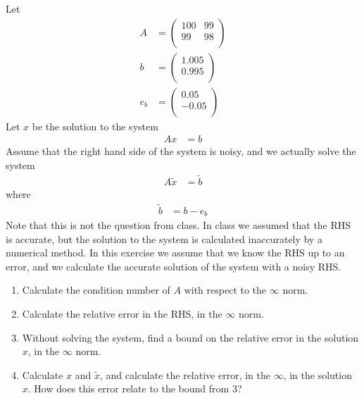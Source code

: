 \documentclass[fleqn, a4paper, 11pt, oneside]{amsart}
\theoremstyle{definition}
\theoremstyle{theorem}
\begin{document}
\begin{question}
	Let
	\begin{align*}
		A &=
			\begin{pmatrix}
				100 & 99 \\
				99  & 98 \\
			\end{pmatrix}\\
		b &=
			\begin{pmatrix}
				1.005 \\
				0.995 \\
			\end{pmatrix}\\
		e_b &=
			\begin{pmatrix}
				0.05  \\
				-0.05 \\
			\end{pmatrix}
	\end{align*}
	Let $x$ be the solution to the system
	\begin{align*}
		A x & = b
	\end{align*}
	Assume that the right hand side of the system is noisy, and we actually solve the system
	\begin{align*}
		A \tilde{x} & = \tilde{b}
	\end{align*}
	where
	\begin{align*}
		\tilde{b} & = b - e_b
	\end{align*}
	Note that this is not the question from class.
	In class we assumed that the RHS is accurate, but the solution to the system is calculated inaccurately by a numerical method.
	In this exercise we assume that we know the RHS up to an error, and we calculate the accurate solution of the system with a noisy RHS.
	\begin{enumerate}
		\item
			Calculate the condition number of $A$ with respect to the $\infty$ norm.
		\item
			Calculate the relative error in the RHS, in the $\infty$ norm.
		\item
			Without solving the system, find a bound on the relative error in the solution $x$, in the $\infty$ norm.
		\item
			Calculate $x$ and $\tilde{x}$, and calculate the relative error, in the $\infty$, in the solution $x$.
			How does this error relate to the bound from 3?
	\end{enumerate}
\end{question}
\end{document}
